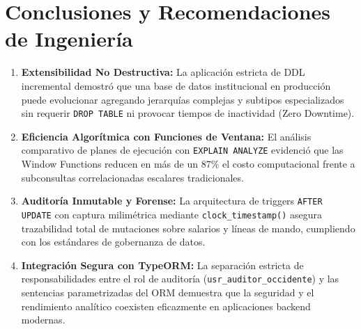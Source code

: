 \documentclass[11pt,a4paper]{article}
\begin{document}
\section{Conclusiones y Recomendaciones de Ingeniería}
\begin{enumerate}
	\item \textbf{Extensibilidad No Destructiva:} La aplicación estricta de DDL incremental demostró que una base de datos institucional en producción puede evolucionar agregando jerarquías complejas y subtipos especializados sin requerir \texttt{DROP TABLE} ni provocar tiempos de inactividad (Zero Downtime).
	\item \textbf{Eficiencia Algorítmica con Funciones de Ventana:} El análisis comparativo de planes de ejecución con \texttt{EXPLAIN ANALYZE} evidenció que las Window Functions reducen en más de un 87\% el costo computacional frente a subconsultas correlacionadas escalares tradicionales.
	\item \textbf{Auditoría Inmutable y Forense:} La arquitectura de triggers \texttt{AFTER UPDATE} con captura milimétrica mediante \texttt{clock\_timestamp()} asegura trazabilidad total de mutaciones sobre salarios y líneas de mando, cumpliendo con los estándares de gobernanza de datos.
	\item \textbf{Integración Segura con TypeORM:} La separación estricta de responsabilidades entre el rol de auditoría (\texttt{usr\_auditor\_occidente}) y las sentencias parametrizadas del ORM demuestra que la seguridad y el rendimiento analítico coexisten eficazmente en aplicaciones backend modernas.
\end{enumerate}
\end{document}

